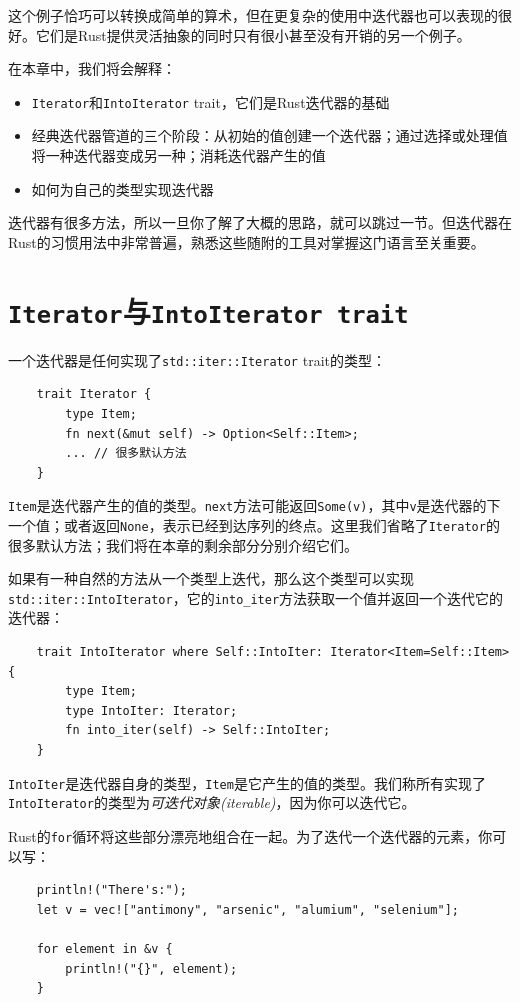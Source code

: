 这个例子恰巧可以转换成简单的算术，但在更复杂的使用中迭代器也可以表现的很好。它们是Rust提供灵活抽象的同时只有很小甚至没有开销的另一个例子。

在本章中，我们将会解释：
\begin{itemize}
    \item \texttt{Iterator}和\texttt{IntoIterator} trait，它们是Rust迭代器的基础
    \item 经典迭代器管道的三个阶段：从初始的值创建一个迭代器；通过选择或处理值将一种迭代器变成另一种；消耗迭代器产生的值
    \item 如何为自己的类型实现迭代器
\end{itemize}

迭代器有很多方法，所以一旦你了解了大概的思路，就可以跳过一节。但迭代器在Rust的习惯用法中非常普遍，熟悉这些随附的工具对掌握这门语言至关重要。

\section{\texttt{Iterator}与\texttt{IntoIterator trait}}\label{iter}

一个迭代器是任何实现了\texttt{std::iter::Iterator} trait的类型：
\begin{verbatim}
    trait Iterator {
        type Item;
        fn next(&mut self) -> Option<Self::Item>;
        ... // 很多默认方法
    }
\end{verbatim}

\texttt{Item}是迭代器产生的值的类型。\texttt{next}方法可能返回\texttt{Some(v)}，其中\texttt{v}是迭代器的下一个值；或者返回\texttt{None}，表示已经到达序列的终点。这里我们省略了\texttt{Iterator}的很多默认方法；我们将在本章的剩余部分分别介绍它们。

如果有一种自然的方法从一个类型上迭代，那么这个类型可以实现\texttt{std::iter::IntoIterator}，它的\texttt{into\_iter}方法获取一个值并返回一个迭代它的迭代器：
\begin{verbatim}
    trait IntoIterator where Self::IntoIter: Iterator<Item=Self::Item> {
        type Item;
        type IntoIter: Iterator;
        fn into_iter(self) -> Self::IntoIter;
    }
\end{verbatim}

\texttt{IntoIter}是迭代器自身的类型，\texttt{Item}是它产生的值的类型。我们称所有实现了\texttt{IntoIterator}的类型为\emph{可迭代对象(iterable)}，因为你可以迭代它。

Rust的\texttt{for}循环将这些部分漂亮地组合在一起。为了迭代一个迭代器的元素，你可以写：
\begin{verbatim}
    println!("There's:");
    let v = vec!["antimony", "arsenic", "alumium", "selenium"];

    for element in &v {
        println!("{}", element);
    }
\end{verbatim}

